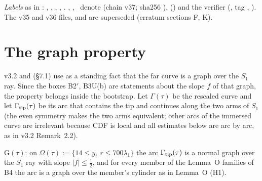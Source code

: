 \documentclass[11pt]{article}
\begin{document}
\noindent\emph{Labels} as in : \tC, \tP, \tH, \tE, \tB. \SU, \SZ, \SV\ denote  (chain v37; sha256 ),  () and the verifier  (, tag , ). The v35 and v36 files,  and  are superseded (erratum sections F, K).

\section{The graph property}\label{C:sec:graph}
v3.2 and  (\S7.1) use as a standing fact that the far curve is a graph over the $S_1$ ray. Since the boxes B2$'$, B3U(b) are statements about the slope $f$ of that graph, the property belongs inside the bootstrap. Let $\Gamma(\tau)$ be the rescaled curve and let $\Gamma_{\rm tip}(\tau)$ be its arc that contains the tip and continues along the two arms of $S_1$ (the even symmetry makes the two arms equivalent; other arcs of the immersed curve are irrelevant because CDF is local and all estimates below are arc by arc, as in v3.2 Remark~2.2).

\begin{definition}[G]\label{C:def:G}
$\mathrm{G}(\tau)$: on $\Omega(\tau):=\{14\le y,\ r\le700\lambda_1\}$ the arc $\Gamma_{\rm tip}(\tau)$ is a normal graph over the $S_1$ ray with slope $|f|\le\frac12$, and for every member of the Lemma~O families of B4 the arc is a graph over the member's cylinder as in Lemma~O (H1).
\end{definition}
\end{document}
